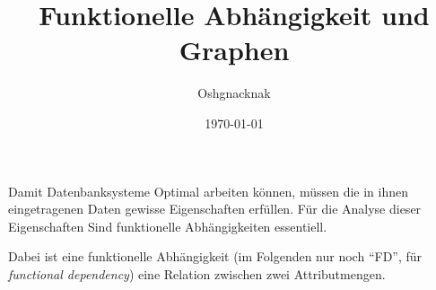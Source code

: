 \documentclass[a4paper, ngerman]{article}
\title{Funktionelle Abhängigkeit und Graphen}
\author{Oshgnacknak}
\date{\today}
\begin{document}
\maketitle

Damit Datenbanksysteme Optimal arbeiten können,
müssen die in ihnen eingetragenen Daten
gewisse Eigenschaften erfüllen.
Für die Analyse dieser Eigenschaften
Sind funktionelle Abhängigkeiten essentiell.

Dabei ist eine funktionelle Abhängigkeit
(im Folgenden nur noch \enquote{FD}, für \emph{functional dependency})
eine Relation zwischen zwei Attributmengen.
\end{document}
